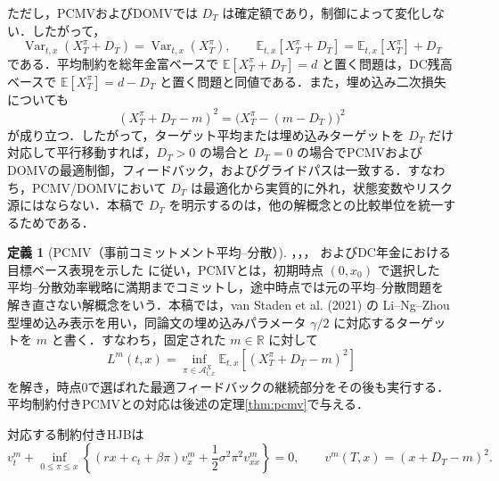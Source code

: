 \documentclass[10pt,a4paper]{article}
\theoremstyle{plain}
\theoremstyle{definition}
\newtheorem{definition}{定義}
\newcommand{\E}{\mathbb{E}}
\DeclareMathOperator{\Var}{Var}
\newcommand{\R}{\mathbb{R}}
\newcommand{\A}{\mathcal{A}}
\begin{document}
ただし，PCMVおよびDOMVでは $D_T$ は確定額であり，制御によって変化しない．したがって，
\begin{equation}
  \Var_{t,x}(X_T^\pi+D_T)=\Var_{t,x}(X_T^\pi),
  \qquad
  \E_{t,x}[X_T^\pi+D_T]=\E_{t,x}[X_T^\pi]+D_T
  \label{eq:deterministic-db-shift}
\end{equation}
である．平均制約を総年金富ベースで $\E[X_T^\pi+D_T]=d$ と置く問題は，DC残高ベースで $\E[X_T^\pi]=d-D_T$ と置く問題と同値である．また，埋め込み二次損失についても
\begin{equation}
  (X_T^\pi+D_T-m)^2
  =\bigl(X_T^\pi-(m-D_T)\bigr)^2
  \label{eq:deterministic-db-target-shift}
\end{equation}
が成り立つ．したがって，ターゲット平均または埋め込みターゲットを $D_T$ だけ対応して平行移動すれば，$D_T>0$ の場合と $D_T=0$ の場合でPCMVおよびDOMVの最適制御，フィードバック，およびグライドパスは一致する．すなわち，PCMV/DOMVにおいて $D_T$ は最適化から実質的に外れ，状態変数やリスク源にはならない．本稿で $D_T$ を明示するのは，他の解概念との比較単位を統一するためである．

\begin{definition}[PCMV（事前コミットメント平均--分散）]
\label{def:pcmv}
\citet{vanStadenDangForsyth2021}，\citet{LiNg2000}，\citet{ZhouLi2000}，
およびDC年金における目標ベース表現を示した \citet{HojgaardVigna2007,Vigna2014,MenoncinVigna2017} に従い，PCMVとは，初期時点 $(0,x_0)$ で選択した
平均--分散効率戦略に満期までコミットし，途中時点では元の平均--分散問題を
解き直さない解概念をいう．本稿では，van Staden et al. (2021) の
Li--Ng--Zhou型埋め込み表示を用い，同論文の埋め込みパラメータ
$\gamma/2$ に対応するターゲットを $m$ と書く．すなわち，固定された
$m\in\R$ に対して
\begin{equation}
  L^m(t,x)=\inf_{\pi\in\A^X_{t,x}}
  \E_{t,x}\left[(X_T^\pi+D_T-m)^2\right]
  \label{eq:embedded-x}
\end{equation}
を解き，時点0で選ばれた最適フィードバックの継続部分をその後も実行する．
平均制約付きPCMVとの対応は後述の定理\ref{thm:pcmv}で与える．
\end{definition}

対応する制約付きHJBは
\begin{equation}
  v_t^m+
  \inf_{0\leq\pi\leq x}
  \left\{
  (rx+c_t+\beta\pi)v_x^m
  +\frac12\sigma^2\pi^2v_{xx}^m
  \right\}=0,
  \qquad
  v^m(T,x)=(x+D_T-m)^2.
  \label{eq:pcmv-hjb-x}
\end{equation}
\end{document}
